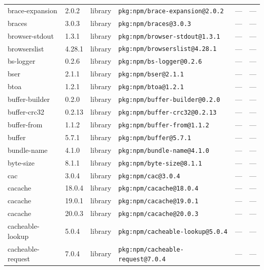 \documentclass[11pt,a4paper]{article}
\begin{document}
\begin{longtable}{|p{4cm}|p{2cm}|p{1.6cm}|p{5cm}|p{1.5cm}|p{3.5cm}|}
\raggedright brace-expansion & 2.0.2 & library & \small\texttt{pkg:npm/brace-expansion@2.0.2} & — & \small — \\
\raggedright braces & 3.0.3 & library & \small\texttt{pkg:npm/braces@3.0.3} & — & \small — \\
\raggedright browser-stdout & 1.3.1 & library & \small\texttt{pkg:npm/browser-stdout@1.3.1} & — & \small — \\
\raggedright browserslist & 4.28.1 & library & \small\texttt{pkg:npm/browserslist@4.28.1} & — & \small — \\
\raggedright bs-logger & 0.2.6 & library & \small\texttt{pkg:npm/bs-logger@0.2.6} & — & \small — \\
\raggedright bser & 2.1.1 & library & \small\texttt{pkg:npm/bser@2.1.1} & — & \small — \\
\raggedright btoa & 1.2.1 & library & \small\texttt{pkg:npm/btoa@1.2.1} & — & \small — \\
\raggedright buffer-builder & 0.2.0 & library & \small\texttt{pkg:npm/buffer-builder@0.2.0} & — & \small — \\
\raggedright buffer-crc32 & 0.2.13 & library & \small\texttt{pkg:npm/buffer-crc32@0.2.13} & — & \small — \\
\raggedright buffer-from & 1.1.2 & library & \small\texttt{pkg:npm/buffer-from@1.1.2} & — & \small — \\
\raggedright buffer & 5.7.1 & library & \small\texttt{pkg:npm/buffer@5.7.1} & — & \small — \\
\raggedright bundle-name & 4.1.0 & library & \small\texttt{pkg:npm/bundle-name@4.1.0} & — & \small — \\
\raggedright byte-size & 8.1.1 & library & \small\texttt{pkg:npm/byte-size@8.1.1} & — & \small — \\
\raggedright cac & 3.0.4 & library & \small\texttt{pkg:npm/cac@3.0.4} & — & \small — \\
\raggedright cacache & 18.0.4 & library & \small\texttt{pkg:npm/cacache@18.0.4} & — & \small — \\
\raggedright cacache & 19.0.1 & library & \small\texttt{pkg:npm/cacache@19.0.1} & — & \small — \\
\raggedright cacache & 20.0.3 & library & \small\texttt{pkg:npm/cacache@20.0.3} & — & \small — \\
\raggedright cacheable-lookup & 5.0.4 & library & \small\texttt{pkg:npm/cacheable-lookup@5.0.4} & — & \small — \\
\raggedright cacheable-request & 7.0.4 & library & \small\texttt{pkg:npm/cacheable-request@7.0.4} & — & \small — \\

\end{longtable}
\end{document}
